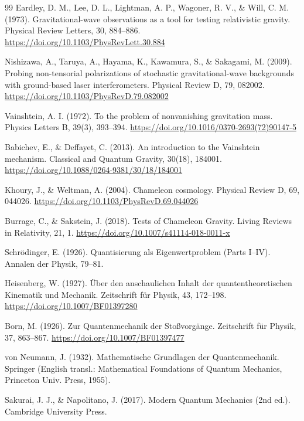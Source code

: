 \begin{thebibliography}{99}
		Eardley, D. M., Lee, D. L., Lightman, A. P., Wagoner, R. V., \& Will, C. M. (1973). Gravitational-wave observations as a tool for testing relativistic gravity. Physical Review Letters, 30, 884–886. \url{https://doi.org/10.1103/PhysRevLett.30.884}
		
		Nishizawa, A., Taruya, A., Hayama, K., Kawamura, S., \& Sakagami, M. (2009). Probing non-tensorial polarizations of stochastic gravitational-wave backgrounds with ground-based laser interferometers. Physical Review D, 79, 082002. \url{https://doi.org/10.1103/PhysRevD.79.082002}
		
		Vainshtein, A. I. (1972). To the problem of nonvanishing gravitation mass. Physics Letters B, 39(3), 393–394. \url{https://doi.org/10.1016/0370-2693(72)90147-5}
		
		Babichev, E., \& Deffayet, C. (2013). An introduction to the Vainshtein mechanism. Classical and Quantum Gravity, 30(18), 184001. \url{https://doi.org/10.1088/0264-9381/30/18/184001}
		
		Khoury, J., \& Weltman, A. (2004). Chameleon cosmology. Physical Review D, 69, 044026. \url{https://doi.org/10.1103/PhysRevD.69.044026}
		
		Burrage, C., \& Sakstein, J. (2018). Tests of Chameleon Gravity. Living Reviews in Relativity, 21, 1. \url{https://doi.org/10.1007/s41114-018-0011-x}
		
		Schrödinger, E. (1926). Quantisierung als Eigenwertproblem (Parts I–IV). Annalen der Physik, 79–81.
		
		Heisenberg, W. (1927). Über den anschaulichen Inhalt der quantentheoretischen Kinematik und Mechanik. Zeitschrift für Physik, 43, 172–198. \url{https://doi.org/10.1007/BF01397280}
		
		Born, M. (1926). Zur Quantenmechanik der Stoßvorgänge. Zeitschrift für Physik, 37, 863–867. \url{https://doi.org/10.1007/BF01397477}
		
		von Neumann, J. (1932). Mathematische Grundlagen der Quantenmechanik. Springer (English transl.: Mathematical Foundations of Quantum Mechanics, Princeton Univ. Press, 1955).
		
		Sakurai, J. J., \& Napolitano, J. (2017). Modern Quantum Mechanics (2nd ed.). Cambridge University Press.
		

\end{thebibliography}

